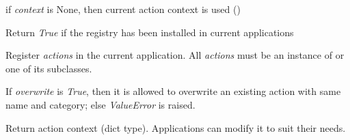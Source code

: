 \documentclass[a4paper,12pt,english]{sphinxmanual}
\begin{document}
\begin{fulllineitems}
\begin{fulllineitems}
if \emph{context} is None, then current action context is used
({\hyperref[api:abilian.web.action.ActionRegistry.context]{\emph{}}})

\end{fulllineitems}


\begin{fulllineitems}
\label{api:abilian.web.action.ActionRegistry.init_app}
\end{fulllineitems}


\begin{fulllineitems}
\label{api:abilian.web.action.ActionRegistry.installed}
Return \emph{True} if the registry has been installed in current applications

\end{fulllineitems}


\begin{fulllineitems}
\label{api:abilian.web.action.ActionRegistry.register}
Register \emph{actions} in the current application. All \emph{actions} must be an
instance of {\hyperref[api:abilian.web.action.Action]{\emph{}}} or one of its subclasses.

If \emph{overwrite} is \emph{True}, then it is allowed to overwrite an existing
action with same name and category; else \emph{ValueError} is raised.

\end{fulllineitems}


\begin{fulllineitems}
\label{api:abilian.web.action.ActionRegistry.context}
Return action context (dict type). Applications can modify it to suit
their needs.

\end{fulllineitems}


\end{fulllineitems}

\end{document}
